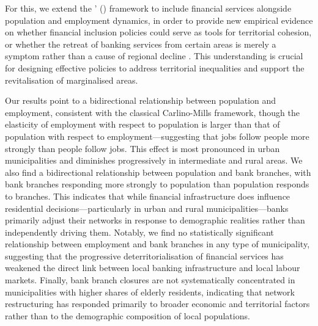 \documentclass[a4paper,11pt,oneside]{article}
\begin{document}
For this, we extend the \citeauthor{carlino1987determinants}' (\citeyear{carlino1987determinants}) framework to include financial services alongside population and employment dynamics, in order to provide new empirical evidence on whether financial inclusion policies could serve as tools for territorial cohesion, or whether the retreat of banking services from certain areas is merely a symptom rather than a cause of regional decline \citep{martin2019financial,goerlich2021distribucion}. This understanding is crucial for designing effective policies to address territorial inequalities and support the revitalisation of marginalised areas.

Our results point to a bidirectional relationship between population and employment,
consistent with the classical Carlino-Mills framework, though the elasticity of
employment with respect to population is larger than that of population with respect
to employment---suggesting that jobs follow people more strongly than people follow
jobs. This effect is most pronounced in urban municipalities and diminishes
progressively in intermediate and rural areas. We also find a bidirectional relationship
between population and bank branches, with bank branches responding more strongly
to population than population responds to branches. This indicates that while financial
infrastructure does influence residential decisions---particularly in urban and rural
municipalities---banks primarily adjust their networks in response to demographic
realities rather than independently driving them. Notably, we find no statistically
significant relationship between employment and bank branches in any type of
municipality, suggesting that the progressive deterritorialisation of financial services
has weakened the direct link between local banking infrastructure and local labour
markets. Finally, bank branch closures are not systematically concentrated in
municipalities with higher shares of elderly residents, indicating that network
restructuring has responded primarily to broader economic and territorial factors
rather than to the demographic composition of local populations.
\end{document}

